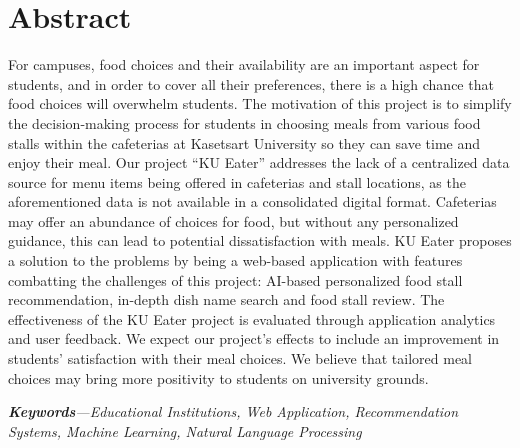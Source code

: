 \chapter*{Abstract}
\label{chap:abstract}

For campuses, food choices and their availability are an important aspect for students,
and in order to cover all their preferences, there is a high chance that food choices will overwhelm students.
The motivation of this project is to simplify the decision-making process for students in choosing meals from
various food stalls within the cafeterias at Kasetsart University so they can save time and enjoy their meal.
Our project “KU Eater” addresses the lack of a centralized data source for menu items being offered in cafeterias and stall locations,
as the aforementioned data is not available in a consolidated digital format. Cafeterias may offer an abundance of choices for food,
but without any personalized guidance, this can lead to potential dissatisfaction with meals.
KU Eater proposes a solution to the problems by being a web-based application with features combatting the challenges of this project:
AI-based personalized food stall recommendation, in-depth dish name search and food stall review.
The effectiveness of the KU Eater project is evaluated through application analytics and user feedback.
We expect our project's effects to include an improvement in students' satisfaction with their meal choices.
We believe that tailored meal choices may bring more positivity to students on university grounds.
\par
\textit{\textbf{Keywords}---Educational Institutions, Web Application, Recommendation Systems, Machine Learning, Natural Language Processing}